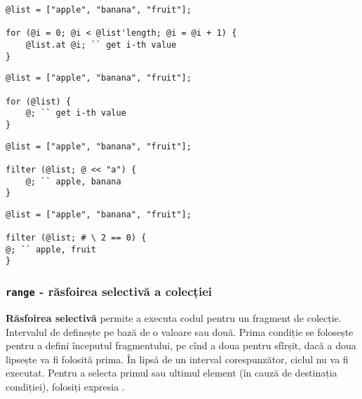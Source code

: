 \begin{sourcecode}
\label{colluniloop}
\begin{verbatim}
@list = ["apple", "banana", "fruit"];

for (@i = 0; @i < @list'length; @i = @i + 1) {
	@list.at @i; `` get i-th value
}
\end{verbatim}
\end{sourcecode}

\begin{sourcecode}
\label{collsimple}
\begin{verbatim}
@list = ["apple", "banana", "fruit"];

for (@list) {
	@; `` get i-th value
}
\end{verbatim}
\end{sourcecode}

\begin{sourcecode}
\label{filterdataex}
\begin{verbatim}
@list = ["apple", "banana", "fruit"];

filter (@list; @ << "a") {
	@; `` apple, banana
}
\end{verbatim}
\end{sourcecode}

\begin{sourcecode}
\label{filterindexex}
\begin{verbatim}
@list = ["apple", "banana", "fruit"];

filter (@list; # \ 2 == 0) {
@; `` apple, fruit
}
\end{verbatim}
\end{sourcecode}

\subsubsection{\texttt{range} - răsfoirea selectivă a colecției}

{\bf Răsfoirea selectivă} permite a executa codul pentru un fragment de colecție. Intervalul de definește pe bază de o valoare sau două. Prima condiție se folosește pentru a defini începutul fragmentului, pe cînd a doua pentru sfîrșit, dacă a doua lipsește va fi folosită prima. În lipsă de un interval corespunzător, ciclul nu va fi executat. Pentru a selecta primul sau ultimul element (în cauză de destinația condiției), folosiți expresia \true{}.

